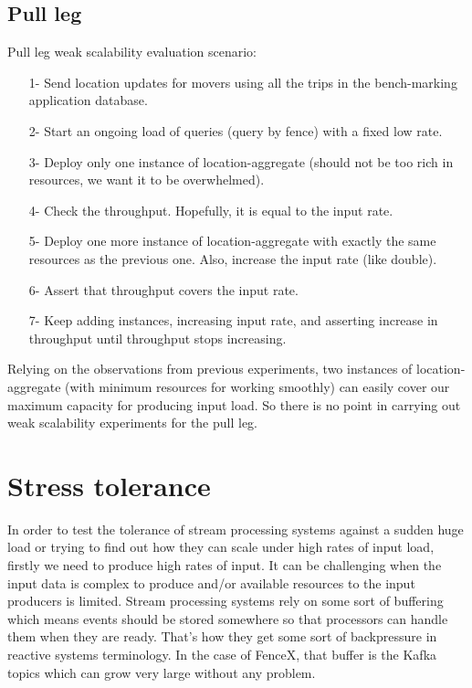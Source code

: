 \documentclass[a4]{report}
\begin{document}
    \subsection{Pull leg}
    Pull leg weak scalability evaluation scenario:
    \begin{itemize}
        \item[1-] Send location updates for movers using all the trips in the bench-marking application database.
        \item[2-] Start an ongoing load of queries (query by fence) with a fixed low rate.
        \item[3-] Deploy only one instance of location-aggregate (should not be too rich in resources, we want it to be overwhelmed).
        \item[4-] Check the throughput.
        Hopefully, it is equal to the input rate.
        \item[5-] Deploy one more instance of location-aggregate with exactly the same resources as the previous one.
        Also, increase the input rate (like double).
        \item[6-] Assert that throughput covers the input rate.
        \item[7-] Keep adding instances, increasing input rate, and asserting increase in throughput until throughput stops increasing.
    \end{itemize}

    Relying on the observations from previous experiments, two instances of location-aggregate (with minimum
    resources for working smoothly) can easily cover our maximum capacity for producing input load.
    So there is no point in carrying out weak scalability experiments for the pull leg.


    \section{Stress tolerance}
    In order to test the tolerance of stream processing systems against a sudden huge load or trying to find out how
    they can scale under high rates of input load, firstly we need to produce high rates of input.
    It can be challenging when the input data is complex to produce and/or available resources to the input producers
    is limited.
    Stream processing systems rely on some sort of buffering which means events should be stored somewhere so
    that processors can handle them when they are ready.
    That's how they get some sort of backpressure in reactive systems terminology.
    In the case of FenceX, that buffer is the Kafka topics which can grow very large without any problem.
\end{document}
